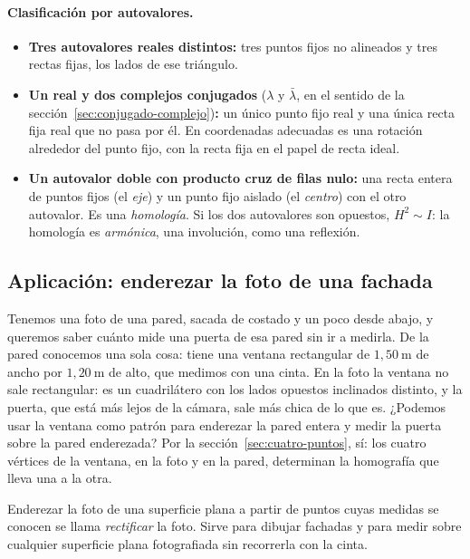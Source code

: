 \paragraph{Clasificación por autovalores.}
\begin{itemize}
  \item \textbf{Tres autovalores reales distintos:} tres puntos fijos no alineados y tres
  rectas fijas, los lados de ese triángulo.
  \item \textbf{Un real y dos complejos conjugados} (\(\lambda\) y \(\bar\lambda\), en el sentido de la sección~\ref{sec:conjugado-complejo})\textbf{:} un único punto fijo real y una única
  recta fija real que no pasa por él. En coordenadas adecuadas es una rotación alrededor del
  punto fijo, con la recta fija en el papel de recta ideal.
  \item \textbf{Un autovalor doble con producto cruz de filas nulo:} una recta entera de
  puntos fijos (el \emph{eje}) y un punto fijo aislado (el \emph{centro}) con el otro
  autovalor. Es una \emph{homología}. Si los dos autovalores son opuestos, \(H^2\sim I\): la
  homología es \emph{armónica}, una involución, como una reflexión.
\end{itemize}

\subsection{Aplicación: enderezar la foto de una fachada}\label{sec:c1-aplicacion-fachada}

Tenemos una foto de una pared, sacada de costado y un poco desde abajo, y queremos saber cuánto
mide una puerta de esa pared sin ir a medirla. De la pared conocemos una sola cosa: tiene una
ventana rectangular de \(1{,}50\ \mathrm{m}\) de ancho por \(1{,}20\ \mathrm{m}\) de alto, que
medimos con una cinta. En la foto la ventana no sale rectangular: es un cuadrilátero con los
lados opuestos inclinados distinto, y la puerta, que está más lejos de la cámara, sale más
chica de lo que es. ¿Podemos usar la ventana como patrón para enderezar la pared entera y medir
la puerta sobre la pared enderezada? Por la sección~\ref{sec:cuatro-puntos}, sí: los cuatro
vértices de la ventana, en la foto y en la pared, determinan la homografía que lleva una a la
otra.

\begin{idea}
Enderezar la foto de una superficie plana a partir de puntos cuyas medidas se conocen se llama
\emph{rectificar} la foto. Sirve para dibujar fachadas y para medir sobre cualquier superficie
plana fotografiada sin recorrerla con la cinta.
\end{idea}

